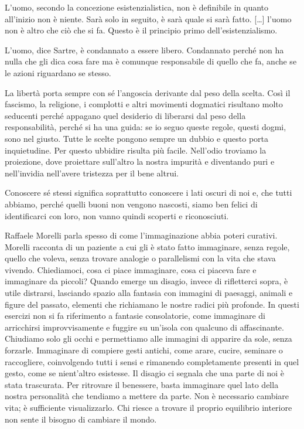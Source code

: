 \documentclass[12pt]{book} %
\begin{document}
L'uomo, secondo la concezione esistenzialistica, non è definibile in quanto all'inizio non è niente. Sarà solo in
seguito, è sarà quale si sarà fatto. […] l'uomo non è altro che ciò che si fa. Questo è il principio primo
dell'esistenzialismo.

L'uomo, dice Sartre, è condannato a essere libero. Condannato perché non ha nulla che gli dica cosa fare ma è comunque
responsabile di quello che fa, anche se le azioni riguardano se stesso.

La libertà porta sempre con sé l'angoscia derivante dal peso della scelta. Così il fascismo, la religione, i complotti e
altri movimenti dogmatici risultano molto seducenti perché appagano quel desiderio di liberarsi dal peso della
responsabilità, perché si ha una guida: se io seguo queste regole, questi dogmi, sono nel giusto. Tutte le scelte
pongono sempre un dubbio e questo porta inquietudine. Per questo ubbidire risulta più facile. Nell'odio troviamo la
proiezione, dove proiettare sull'altro la nostra impurità e diventando puri e nell'invidia
nell'avere tristezza per il bene altrui.

Conoscere sé stessi significa soprattutto conoscere i lati oscuri di noi e, che tutti abbiamo, perché quelli buoni non
vengono nascosti, siamo ben felici di identificarci con loro, non vanno quindi scoperti e riconosciuti.

Raffaele Morelli parla spesso di come l'immaginazione abbia poteri curativi. Morelli racconta di un
paziente a cui gli è stato fatto immaginare, senza regole, quello che voleva, senza trovare analogie o parallelismi con
la vita che stava vivendo. Chiediamoci, cosa ci piace immaginare, cosa ci piaceva fare e immaginare da piccoli?
Quando emerge un disagio, invece di rifletterci sopra, è utile distrarsi, lasciando spazio alla fantasia con immagini di paesaggi, animali e figure del passato, elementi che richiamano le nostre radici più profonde. In questi esercizi non si fa riferimento a fantasie consolatorie, come immaginare di arricchirsi improvvisamente e fuggire su un’isola con qualcuno di affascinante. Chiudiamo solo gli occhi e permettiamo alle immagini di apparire da sole, senza forzarle. Immaginare di compiere gesti antichi, come arare, cucire, seminare o raccogliere, coinvolgendo tutti i sensi e rimanendo completamente presenti in quel gesto, come se nient’altro esistesse.
Il disagio ci segnala che una parte di noi è stata trascurata. Per ritrovare il benessere, basta immaginare quel lato della nostra personalità che tendiamo a mettere da parte. Non è necessario cambiare vita; è sufficiente visualizzarlo. Chi riesce a trovare il proprio equilibrio interiore non sente il bisogno di cambiare il mondo.
\end{document}
